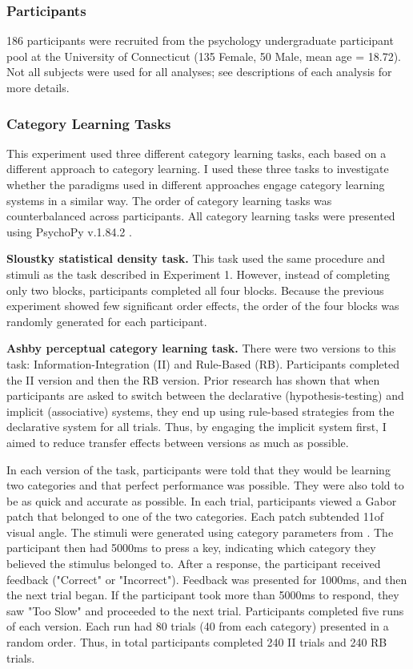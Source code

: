 \documentclass[../dissertation.tex]{subfiles}
\begin{document}
\subsubsection{Participants}
186 participants were recruited from the psychology undergraduate participant pool at the University of Connecticut (135 Female, 50 Male, mean age = 18.72). Not all subjects were used for all analyses; see descriptions of each analysis for more details.
\subsubsection{Category Learning Tasks}
This experiment used three different category learning tasks, each based on a different approach to category learning. I used these three tasks to investigate whether the paradigms used in different approaches engage category learning systems in a similar way. The order of category learning tasks was counterbalanced across participants. All category learning tasks were presented using PsychoPy v.1.84.2 \citep{Peirce2007}. \par 
\textbf{Sloustky statistical density task.} This task used the same procedure and stimuli as the task described in Experiment 1. However, instead of completing only two blocks, participants completed all four blocks. Because the previous experiment showed few significant order effects, the order of the four blocks was randomly generated for each participant. \par
\textbf{Ashby perceptual category learning task.} There were two versions to this task: Information-Integration (II) and Rule-Based (RB). Participants completed the II version and then the RB version. Prior research has shown that when participants are asked to switch between the declarative (hypothesis-testing) and implicit (associative) systems, they end up using rule-based strategies from the declarative system for all trials. Thus, by engaging the implicit system first, I aimed to reduce transfer effects between versions as much as possible. \par
In each version of the task, participants were told that they would be learning two categories and that perfect performance was possible. They were also told to be as quick and accurate as possible. In each trial, participants viewed a Gabor patch that belonged to one of the two categories. Each patch subtended 11\degree  of visual angle. The stimuli were generated using category parameters from \citet{Maddox2003}. The participant then had 5000ms to press a key, indicating which category they believed the stimulus belonged to. After a response, the participant received feedback ("Correct" or "Incorrect"). Feedback was presented for 1000ms, and then the next trial began. If the participant took more than 5000ms to respond, they saw "Too Slow" and proceeded to the next trial. Participants completed five runs of each version. Each run had 80 trials (40 from each category) presented in a random order. Thus, in total participants completed 240 II trials and 240 RB trials. \par
\end{document}
